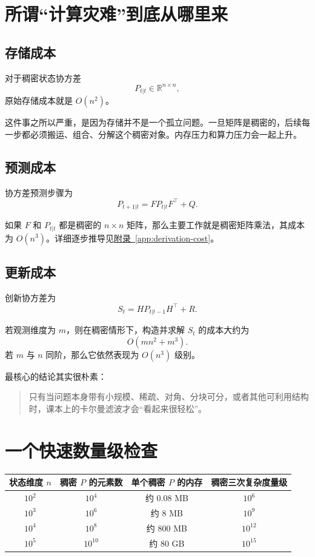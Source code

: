 \documentclass[12pt,a4paper]{ctexart}
\begin{document}

\section{所谓“计算灾难”到底从哪里来}

\subsection{存储成本}

对于稠密状态协方差
\[
P_{t|t} \in \mathbb{R}^{n \times n},
\]
原始存储成本就是 \(O(n^2)\)。

这件事之所以严重，是因为存储并不是一个孤立问题。一旦矩阵是稠密的，后续每一步都必须搬运、组合、分解这个稠密对象。内存压力和算力压力会一起上升。

\subsection{预测成本}

协方差预测步骤为
\[
P_{t+1|t} = F P_{t|t} F^\top + Q.
\]

如果 \(F\) 和 \(P_{t|t}\) 都是稠密的 \(n \times n\) 矩阵，那么主要工作就是稠密矩阵乘法，其成本为 \(O(n^3)\)。详细逐步推导见\hyperref[app:derivation-cost]{附录~\ref*{app:derivation-cost}}。

\subsection{更新成本}

创新协方差为
\[
S_t = H P_{t|t-1} H^\top + R.
\]

若观测维度为 \(m\)，则在稠密情形下，构造并求解 \(S_t\) 的成本大约为
\[
O(m n^2 + m^3).
\]
若 \(m\) 与 \(n\) 同阶，那么它依然表现为 \(O(n^3)\) 级别。

最核心的结论其实很朴素：
\begin{quote}
只有当问题本身带有小规模、稀疏、对角、分块可分，或者其他可利用结构时，课本上的卡尔曼滤波才会“看起来很轻松”。
\end{quote}

\section{一个快速数量级检查}

\begin{center}
\begin{tabular}{cccc}
\toprule
状态维度 \(n\) & 稠密 \(P\) 的元素数 & 单个稠密 \(P\) 的内存 & 稠密三次复杂度量级 \\
\midrule
\(10^2\) & \(10^4\) & 约 \(0.08\) MB & \(10^6\) \\
\(10^3\) & \(10^6\) & 约 \(8\) MB & \(10^9\) \\
\(10^4\) & \(10^8\) & 约 \(800\) MB & \(10^{12}\) \\
\(10^5\) & \(10^{10}\) & 约 \(80\) GB & \(10^{15}\) \\
\bottomrule
\end{tabular}
\end{center}
\end{document}
